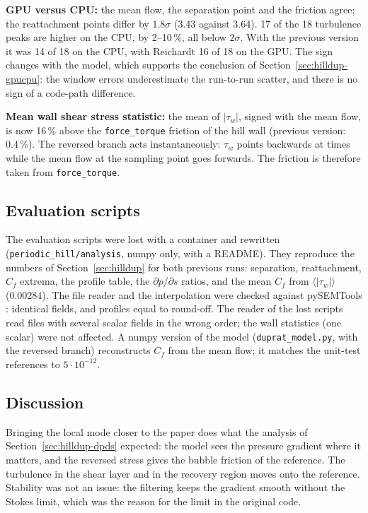 \documentclass[11pt,a4paper]{article}
\newcommand{\code}[1]{\texttt{#1}}
\newcommand{\dpds}{\partial p/\partial s}
\begin{document}
\noindent\textbf{GPU versus CPU:} the mean flow, the separation point and
the friction agree; the reattachment points differ by $1.8\sigma$ (3.43
against 3.64). 17 of the 18 turbulence peaks are higher on the CPU, by
2--10\,\%, all below $2\sigma$. With the previous version it was 14 of 18 on
the CPU, with Reichardt 16 of 18 on the GPU. The sign changes with the
model, which supports the conclusion of Section~\ref{sec:hilldup-gpucpu}:
the window errors underestimate the run-to-run scatter, and there is no sign
of a code-path difference.

\noindent\textbf{Mean wall shear stress statistic:} the mean of
$|\tau_w|$, signed with the mean flow, is now 16\,\% above the
\code{force\_torque} friction of the hill wall (previous version: 0.4\,\%).
The reversed branch acts instantaneously: $\tau_w$ points backwards at times
while the mean flow at the sampling point goes forwards. The friction is
therefore taken from \code{force\_torque}.

\subsection{Evaluation scripts}

The evaluation scripts were lost with a container and rewritten
(\code{periodic\_hill/analysis}, numpy only, with a README). They
reproduce the numbers of Section~\ref{sec:hilldup} for both previous runs:
separation, reattachment, $C_f$ extrema, the profile table, the $\dpds$
ratios, and the mean $C_f$ from $\langle|\tau_w|\rangle$ (0.00284). The file
reader and the interpolation were checked against pySEMTools
\cite{pysemtools}: identical fields, and profiles equal to round-off. The
reader of the lost scripts read files with several scalar fields in the
wrong order; the wall statistics (one scalar) were not affected. A numpy
version of the model (\code{duprat\_model.py}, with the reversed branch)
reconstructs $C_f$ from the mean flow; it matches the unit-test references
to $5\cdot10^{-12}$.

\subsection{Discussion}

Bringing the local mode closer to the paper does what the analysis of
Section~\ref{sec:hilldup-dpds} expected: the model sees the pressure
gradient where it matters, and the reversed stress gives the bubble
friction of the reference. The turbulence in the shear layer and in the
recovery region moves onto the reference. Stability was not an issue: the
filtering keeps the gradient smooth without the Stokes limit, which was the
reason for the limit in the original code.
\end{document}
